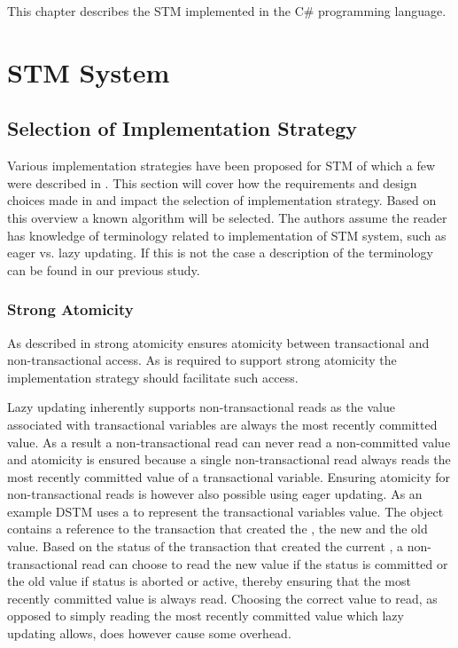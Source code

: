\makeatletter {}\makeatother
{}
This chapter describes the \ac{STM} implemented in the C\# programming language.
\label{chap:implementation}
\section{\acs{STM} System}
\subsection{Selection of Implementation Strategy}
Various implementation strategies have been proposed for \ac{STM} of which a few were described in . This section will cover how the requirements and design choices made in  and  impact the selection of implementation strategy. Based on this overview a known algorithm will be selected. The authors assume the reader has knowledge of terminology related to implementation of \ac{STM} system, such as eager vs. lazy updating. If this is not the case a description of the terminology can be found in our previous study\cite[p. 53]{dpt907e14trending}.

\subsubsection{Strong Atomicity}
As described in  strong atomicity ensures atomicity between transactional and non-transactional access. As \stmnamesp is required to support strong atomicity the implementation strategy should facilitate such access.

Lazy updating inherently supports non-transactional reads as the value associated with transactional variables are always the most recently committed value\cite[p. 2084]{herlihy2011tm}\cite[p. 21]{harris2010transactional}. As a result a non-transactional read can never read a non-committed value and atomicity is ensured because a single non-transactional read always reads the most recently committed value of a transactional variable. Ensuring atomicity for non-transactional reads is however also possible using eager updating. As an example DSTM\cite{herlihy2003software} uses a  to represent the transactional variables value. The  object contains a reference to the transaction that created the , the new and the old value. Based on the status of the transaction that created the current , a non-transactional read can choose to read the new value if the status is committed or the old value if status is aborted or active, thereby ensuring that the most recently committed value is always read. Choosing the correct value to read, as opposed to simply reading the most recently committed value which lazy updating allows, does however cause some overhead.

